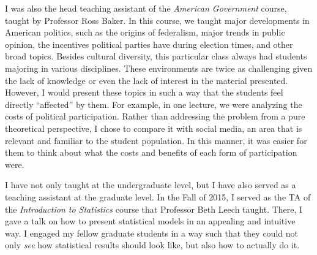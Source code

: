 \documentclass[10pt,stdletter,dateno,sigleft]{newlfm} %
\begin{document}
\begin{newlfm}
I was also the head teaching assistant of the \emph{American Government} course, taught by Professor Ross Baker. In this course, we taught major developments in American politics, such as the origins of federalism, major trends in public opinion, the incentives political parties have during election times, and other broad topics. Besides cultural diversity, this particular class always had students majoring in various disciplines. These environments are twice as challenging given the lack of knowledge or even the lack of interest in the material presented. However, I would present these topics in such a way that the students feel directly ``affected'' by them. For example, in one lecture, we were analyzing the costs of political participation. Rather than addressing the problem from a pure theoretical perspective, I chose to compare it with social media, an area that is relevant and familiar to the student population. In this manner, it was easier for them to think about what the costs and benefits of each form of participation were. 

I have not only taught at the undergraduate level, but I have also served as a teaching assistant at the graduate level. In the Fall of 2015, I served as the TA of the \emph{Introduction to Statistics} course that Professor Beth Leech taught. There, I gave a talk on how to present statistical models in an appealing and intuitive way. I engaged my fellow graduate students in a way such that they could not only \emph{see} how statistical results should look like, but also how to actually do it. 


\end{newlfm}
\end{document}

